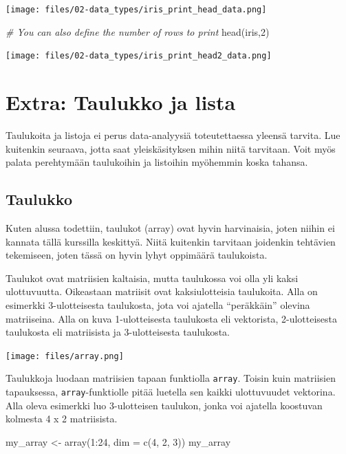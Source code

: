 \documentclass[
]{book}
\newenvironment{Shaded}{\begin{snugshade}}{\end{snugshade}}
\newcommand{\AttributeTok}[1]{\textcolor[rgb]{0.77,0.63,0.00}{#1}}
\newcommand{\CommentTok}[1]{\textcolor[rgb]{0.56,0.35,0.01}{\textit{#1}}}
\newcommand{\DecValTok}[1]{\textcolor[rgb]{0.00,0.00,0.81}{#1}}
\newcommand{\FunctionTok}[1]{\textcolor[rgb]{0.00,0.00,0.00}{#1}}
\newcommand{\NormalTok}[1]{#1}
\newcommand{\OtherTok}[1]{\textcolor[rgb]{0.56,0.35,0.01}{#1}}
\newcommand{\SpecialCharTok}[1]{\textcolor[rgb]{0.00,0.00,0.00}{#1}}
\begin{document}
\texttt{[image: files/02-data\_types/iris\_print\_head\_data.png]}

\begin{Shaded}
\begin{Highlighting}[]
\CommentTok{\# You can also define the number of rows to print}
\FunctionTok{head}\NormalTok{(iris,}\DecValTok{2}\NormalTok{)}
\end{Highlighting}
\end{Shaded}

\texttt{[image: files/02-data\_types/iris\_print\_head2\_data.png]}

\hypertarget{extra-taulukko-ja-lista}{%
\section{Extra: Taulukko ja lista}\label{extra-taulukko-ja-lista}}

Taulukoita ja listoja ei perus data-analyysiä toteutettaessa yleensä tarvita. Lue kuitenkin seuraava, jotta saat yleiskäsityksen mihin niitä tarvitaan. Voit myös palata perehtymään taulukoihin ja listoihin myöhemmin koska tahansa.

\hypertarget{array}{%
\subsection{Taulukko}\label{array}}

Kuten alussa todettiin, taulukot (array) ovat hyvin harvinaisia, joten niihin ei kannata tällä kurssilla keskittyä. Niitä kuitenkin tarvitaan joidenkin tehtävien tekemiseen, joten tässä on hyvin lyhyt oppimäärä taulukoista.

Taulukot ovat matriisien kaltaisia, mutta taulukossa voi olla yli kaksi ulottuvuutta. Oikeastaan matriisit ovat kaksiulotteisia taulukoita. Alla on esimerkki 3-ulotteisesta taulukosta, jota voi ajatella ``peräkkäin'' olevina matriiseina. Alla on kuva 1-ulotteisesta taulukosta eli vektorista, 2-ulotteisesta taulukosta eli matriisista ja 3-ulotteisesta taulukosta.

\texttt{[image: files/array.png]}

Taulukkoja luodaan matriisien tapaan funktiolla \texttt{array}. Toisin kuin matriisien tapauksessa, \texttt{array}-funktiolle pitää luetella sen kaikki ulottuvuudet vektorina. Alla oleva esimerkki luo 3-ulotteisen taulukon, jonka voi ajatella koostuvan kolmesta 4 x 2 matriisista.

\begin{Shaded}
\begin{Highlighting}[]
\NormalTok{my\_array }\OtherTok{\textless{}{-}} \FunctionTok{array}\NormalTok{(}\DecValTok{1}\SpecialCharTok{:}\DecValTok{24}\NormalTok{, }\AttributeTok{dim =} \FunctionTok{c}\NormalTok{(}\DecValTok{4}\NormalTok{, }\DecValTok{2}\NormalTok{, }\DecValTok{3}\NormalTok{))}
\NormalTok{my\_array}
\end{Highlighting}
\end{Shaded}
\end{document}
